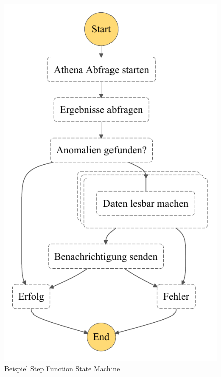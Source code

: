 \begin{figure}[H]
\centering
\includegraphics[height=0.45\textheight]{graphics/Step-Function-Athena.pdf}
\caption{Beispiel Step Function State Machine}
\label{abb:StepFunctionExample}
\end{figure}

